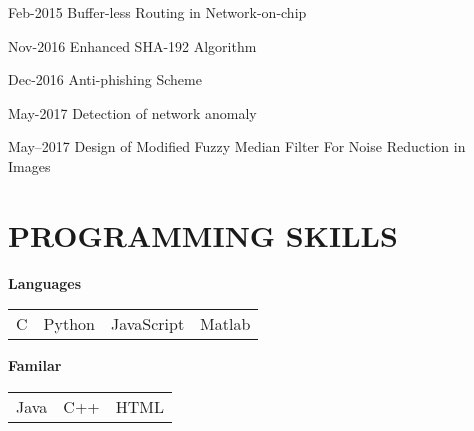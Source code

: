 \documentclass[]{cv-style}          %
\begin{document}
\begin{entrylist}
\entry
{Feb-2015}
{Buffer-less Routing in Network-on-chip }
{}
{\vspace{-0.3cm}}

\end{entrylist}
%
\begin{entrylist}
\entry
{Nov-2016}
{Enhanced SHA-192 Algorithm}
{}
{\vspace{-0.3cm}}
\end{entrylist}
\begin{entrylist}
\entry
{Dec-2016}
{Anti-phishing Scheme }
{}
{\vspace{-0.3cm}}
%
\end{entrylist}
%
\begin{entrylist}
\entry
{May-2017}
{Detection of network anomaly}
{}
{\vspace{-0.3cm}}


\end{entrylist}
%
\begin{entrylist}
\entry
{May--2017}
{Design of Modified Fuzzy Median Filter For Noise Reduction in Images }
{}
{\vspace{-0.3cm}}

\end{entrylist}
%

\section{PROGRAMMING SKILLS}

  \vspace{-0.2cm}
  \begin{entrylist}
\entry
 {\textbf{Languages}}
{}
{}
{\begin{tabular}{p{} p{} p{} p{}}
 C & Python &  JavaScript &  Matlab  \\ 
\end{tabular}}
  {\vspace{-0.3cm}}
\end{entrylist}
%
\begin{entrylist}
\entry
 {\textbf{Familar}}
{}
{}
{\begin{tabular}{p{} p{} p{}}
 Java & C++ &  HTML\\
\end{tabular}}
\end{entrylist}
%
\end{document}
